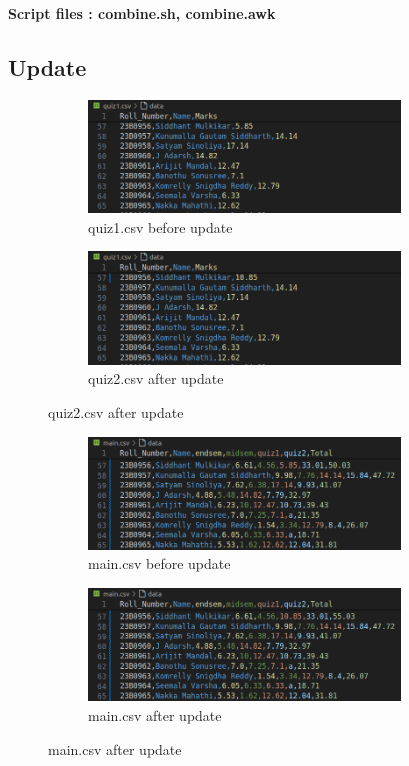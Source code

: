 \documentclass{article}
\begin{document}
\textbf{Script files : combine.sh, combine.awk}


\subsection{Update}
\begin{figure}[h]
    \begin{subfigure}{0.5\textwidth}
    \includegraphics[width=\linewidth, height=3cm]{quiz-before.png} 
    \caption{quiz1.csv before update}
    \end{subfigure}
    \begin{subfigure}{0.5\textwidth}
    \includegraphics[width=\linewidth, height=3cm]{quiz-after.png}
    \caption{quiz2.csv after update}
    \end{subfigure}
\end{figure}
\begin{figure}[h]
    \begin{subfigure}{0.5\textwidth}
    \includegraphics[width=\linewidth, height=3cm]{main-before.png} 
    \caption{main.csv before update}
    \end{subfigure}
    \begin{subfigure}{0.5\textwidth}
    \includegraphics[width=\linewidth, height=3cm]{main-after.png}
    \caption{main.csv after update}
    \end{subfigure}
\end{figure}
\end{document}
